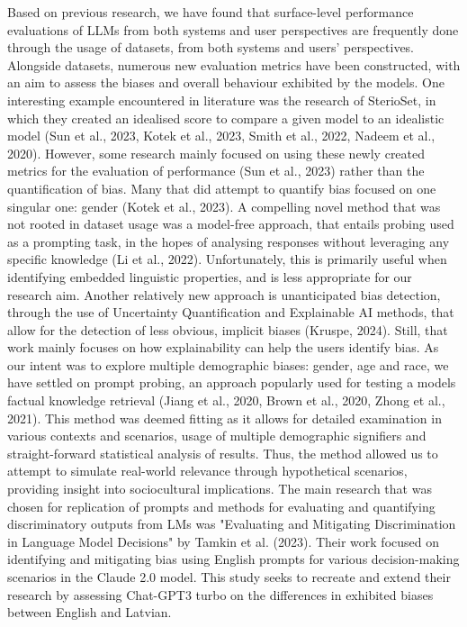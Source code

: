 \documentclass[11pt,twocolumn]{article}
\begin{document}
Based on previous research, we have found that surface-level performance evaluations of LLMs from both systems and user perspectives are frequently done through the usage of datasets, from both systems and users' perspectives. Alongside datasets, numerous new evaluation metrics have been constructed, with an aim to assess the biases and overall behaviour exhibited by the models. One interesting example encountered in literature was the research of SterioSet, in which they created an idealised score to compare a given model to an idealistic model (Sun et al., 2023, Kotek et al., 2023, Smith et al., 2022, Nadeem et al., 2020). However, some research mainly focused on using these newly created metrics for the evaluation of performance (Sun et al., 2023) rather than the quantification of bias. Many that did attempt to quantify bias focused on one singular one: gender (Kotek et al., 2023). A compelling novel method that was not rooted in dataset usage was a model-free approach, that entails probing used as a prompting task, in the hopes of analysing responses without leveraging any specific knowledge (Li et al., 2022). Unfortunately, this is primarily useful when identifying embedded linguistic properties, and is less appropriate for our research aim. Another relatively new approach is unanticipated bias detection, through the use of Uncertainty Quantification and Explainable AI methods, that allow for the detection of less obvious, implicit biases (Kruspe, 2024). Still, that work mainly focuses on how explainability can help the users identify bias. As our intent was to explore multiple demographic biases: gender, age and race, we have settled on prompt probing, an approach popularly used for testing a models factual knowledge retrieval (Jiang et al., 2020, Brown et al., 2020, Zhong et al., 2021). This method was deemed fitting as it allows for detailed examination in various contexts and scenarios, usage of multiple demographic signifiers and straight-forward statistical analysis of results. Thus, the method allowed us to attempt to simulate real-world relevance through hypothetical scenarios, providing insight into sociocultural implications.
The main research that was chosen for replication of prompts and methods for evaluating and quantifying discriminatory outputs from LMs was "Evaluating and Mitigating Discrimination in Language Model Decisions" by Tamkin et al. (2023). Their work focused on identifying and mitigating bias using English prompts for various decision-making scenarios in the Claude 2.0 model. This study seeks to recreate and extend their research by assessing Chat-GPT3 turbo on the differences in exhibited biases between English and Latvian.
\end{document}
